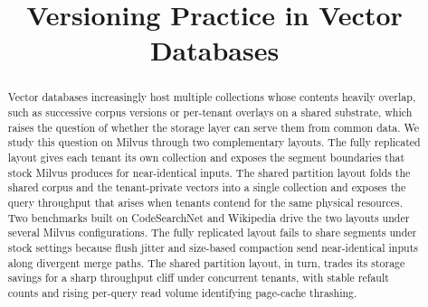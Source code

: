 \documentclass[letterpaper,twocolumn,10pt]{article}
\begin{document}
\date{}

\title{Versioning Practice in Vector Databases}

\maketitle

\begin{abstract}
Vector databases increasingly host multiple collections whose
contents heavily overlap, such as successive corpus versions or
per-tenant overlays on a shared substrate, which raises the
question of whether the storage layer can serve them from common
data. We study this question on Milvus through two complementary
layouts. The fully replicated layout gives each tenant its own
collection and exposes the segment boundaries that stock Milvus
produces for near-identical inputs. The shared partition layout
folds the shared corpus and the tenant-private vectors into a
single collection and exposes the query throughput that arises
when tenants contend for the same physical resources. Two
benchmarks built on CodeSearchNet and Wikipedia drive the two
layouts under several Milvus configurations. The fully replicated
layout fails to share segments under stock settings because flush
jitter and size-based compaction send near-identical inputs along
divergent merge paths. The shared partition
layout, in turn, trades its storage savings for a sharp throughput
cliff under concurrent tenants, with stable refault counts and
rising per-query read volume identifying page-cache thrashing.
\end{abstract}









\newpage


\end{document}
